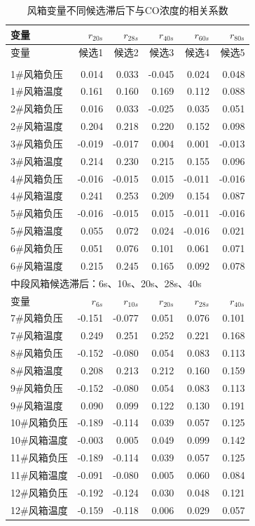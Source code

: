 \documentclass[UTF8,a4paper,zihao=-4]{ctexart}
\newcommand{\CO}{CO}
\begin{document}
\begin{longtable}{lrrrrr}
\caption{风箱变量不同候选滞后下与\CO 浓度的相关系数}\\
\toprule
变量 & $r_{20s}$ & $r_{28s}$ & $r_{40s}$ & $r_{60s}$ & $r_{80s}$ \\
\midrule
\endfirsthead

\toprule
变量 & 候选1 & 候选2 & 候选3 & 候选4 & 候选5 \\
\midrule
\endhead

\midrule
\endfoot

\bottomrule
\endlastfoot

\multicolumn{6}{l}{前段风箱候选滞后：20s、28s、40s、60s、80s} \\
1\#风箱负压 & 0.014 & 0.033 & -0.045 & 0.024 & 0.048 \\
1\#风箱温度 & 0.161 & 0.160 & 0.169 & 0.112 & 0.088 \\
2\#风箱负压 & 0.016 & 0.033 & -0.025 & 0.035 & 0.051 \\
2\#风箱温度 & 0.204 & 0.218 & 0.220 & 0.152 & 0.098 \\
3\#风箱负压 & -0.019 & -0.017 & 0.004 & 0.001 & -0.013 \\
3\#风箱温度 & 0.214 & 0.230 & 0.215 & 0.155 & 0.096 \\
4\#风箱负压 & -0.016 & -0.015 & 0.015 & -0.011 & -0.016 \\
4\#风箱温度 & 0.241 & 0.253 & 0.209 & 0.154 & 0.087 \\
5\#风箱负压 & -0.016 & -0.015 & 0.015 & -0.011 & -0.016 \\
5\#风箱温度 & 0.055 & 0.072 & 0.024 & -0.016 & 0.021 \\
6\#风箱负压 & 0.051 & 0.076 & 0.101 & 0.061 & 0.071 \\
6\#风箱温度 & 0.215 & 0.245 & 0.165 & 0.092 & 0.078 \\

\midrule
\multicolumn{6}{l}{中段风箱候选滞后：6s、10s、20s、28s、40s} \\
变量 & $r_{6s}$ & $r_{10s}$ & $r_{20s}$ & $r_{28s}$ & $r_{40s}$ \\
\midrule
7\#风箱负压 & -0.151 & -0.077 & 0.051 & 0.076 & 0.101 \\
7\#风箱温度 & 0.249 & 0.251 & 0.252 & 0.221 & 0.168 \\
8\#风箱负压 & -0.152 & -0.080 & 0.054 & 0.083 & 0.113 \\
8\#风箱温度 & 0.208 & 0.213 & 0.212 & 0.160 & 0.159 \\
9\#风箱负压 & -0.152 & -0.080 & 0.054 & 0.083 & 0.113 \\
9\#风箱温度 & 0.090 & 0.099 & 0.122 & 0.130 & 0.191 \\
10\#风箱负压 & -0.189 & -0.114 & 0.039 & 0.057 & 0.125 \\
10\#风箱温度 & -0.003 & 0.005 & 0.049 & 0.099 & 0.142 \\
11\#风箱负压 & -0.189 & -0.114 & 0.039 & 0.057 & 0.125 \\
11\#风箱温度 & -0.091 & -0.080 & 0.005 & 0.060 & 0.084 \\
12\#风箱负压 & -0.192 & -0.124 & 0.030 & 0.048 & 0.121 \\
12\#风箱温度 & -0.159 & -0.118 & 0.006 & 0.029 & 0.057 \\


\end{longtable}
\end{document}
